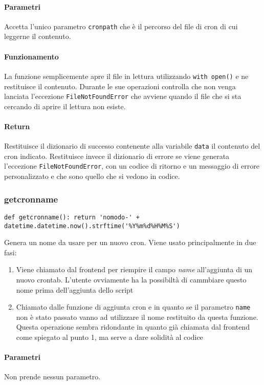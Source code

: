 \documentclass[11pt]{article}
\begin{document}
\paragraph{Parametri}
Accetta l'unico parametro \texttt{cronpath} che è il percorso del file di cron di cui leggerne il contenuto.
\paragraph{Funzionamento}
La funzione semplicemente apre il file in lettura utilizzando \texttt{with open()} e ne restituisce il contenuto.
Durante le sue operazioni controlla che non venga lanciata l'eccezione \texttt{FileNotFoundError} che avviene
quando il file che si sta cercando di aprire il lettura non esiste.
\paragraph{Return}
Restituisce il dizionario di successo contenente alla variabile \texttt{data} il contenuto del cron indicato.
Restituisce invece il dizionario di errore se viene generata l'eccezione \texttt{FileNotFoundError}, con
un codice di ritorno e un messaggio di errore personalizzato e che sono quello che si vedono in codice.

\subsubsection{getcronname}\label{getcronname}
\begin{lstlisting}
def getcronname(): return 'nomodo-' + datetime.datetime.now().strftime('%Y%m%d%H%M%S')
\end{lstlisting}
Genera un nome da usare per un nuovo cron. Viene usato principalmente in due fasi:
\begin{enumerate}
	\item{Viene chiamato dal frontend per riempire il campo \textit{name} all'aggiunta di un nuovo crontab.
		L'utente ovviamente ha la possibiltà di cammbiare questo nome prima dell'aggiunta dello script}
	\item{Chiamato dalle funzione di aggiunta cron  e  in quanto
		se il parametro \texttt{name} non è stato passato vanno ad utilizzare il nome restituito da
		questa funzione. Questa operazione sembra ridondante in quanto già chiamata dal frontend come
		spiegato al punto 1, ma serve a dare solidità al codice}
\end{enumerate}
\paragraph{Parametri}
Non prende nessun parametro.
\end{document}
